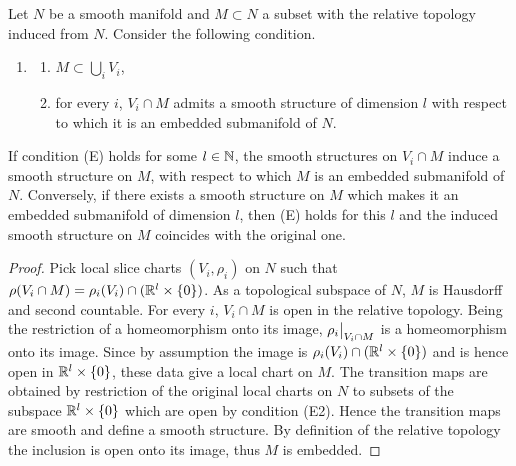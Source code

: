 \begin{lem}\label{prop 1.7.3 RS1}
    Let $N$ be a smooth manifold and $M\subset N$ a subset with the relative topology induced from $N$. Consider the following condition.
    \begin{enumerate}[label=(E)]
        \item \begin{enumerate}[label=(E\alph*)]
            \item $M\subset \bigcup_i V_i$,
            \item for every $i$, $V_i\cap M$ admits a smooth structure of dimension $l$ with respect to which it is an embedded submanifold of $N$.
        \end{enumerate}
    \end{enumerate}
    If condition (E) holds for some $l\in\mathbb{N}$, the smooth structures on $V_i\cap M$ induce a smooth structure on $M$, with respect to which $M$ is an embedded submanifold of $N$. Conversely, if there exists a smooth structure on $M$ which makes it an embedded submanifold of dimension $l$, then (E) holds for this $l$ and the induced smooth structure on $M$ coincides with the original one.
\end{lem}
\begin{proof}
    Pick local slice charts $(V_i,\rho_i)$ on $N$ such that $\rho(V_i\cap M)=\rho_i(V_i)\cap (\mathbb{R}^l\times \{0\})$. As a topological subspace of $N$, $M$ is Hausdorff and second countable. For every $i$, $V_i\cap M$ is open in the relative topology. Being the restriction of a homeomorphism onto its image, $\restr{\rho_i}{V_i\cap M}$ is a homeomorphism onto its image. Since by assumption the image is $\rho_i(V_i)\cap (\mathbb{R}^l\times\{0\})$ and is hence open in $\mathbb{R}^l\times\{0\}$, these data give a local chart on $M$. The transition maps are obtained by restriction of the original local charts on $N$ to subsets of the subspace $\mathbb{R}^l\times\{0\}$ which are open by condition (E2). Hence the transition maps are smooth and define a smooth structure. By definition of the relative topology the inclusion is open onto its image, thus $M$ is embedded.
\end{proof}


